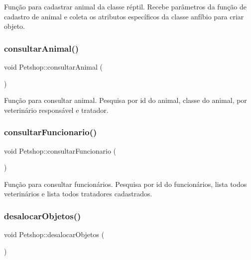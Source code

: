 Função para cadastrar animal da classe réptil. Recebe parâmetros da função de cadastro de animal e coleta os atributos específicos da classe anfíbio para criar objeto. \mbox{\label{classPetshop_af6e4fc598318c6ef7d9789a9328e312a}} 
\subsubsection{\texorpdfstring{consultar\+Animal()}{consultarAnimal()}}
{\footnotesize\ttfamily void Petshop\+::consultar\+Animal (\begin{DoxyParamCaption}{ }\end{DoxyParamCaption})}

Função para consultar animal. Pesquisa por id do animal, classe do animal, por veterinário responsável e tratador. \mbox{\label{classPetshop_ab4324d868f6aceeaa9ee34a9ae3b8349}} 
\subsubsection{\texorpdfstring{consultar\+Funcionario()}{consultarFuncionario()}}
{\footnotesize\ttfamily void Petshop\+::consultar\+Funcionario (\begin{DoxyParamCaption}{ }\end{DoxyParamCaption})}

Função para consultar funcionários. Pesquisa por id do funcionários, lista todos veterinários e lista todos tratadores cadastrados. \mbox{\label{classPetshop_af6269c2a28c849dc2ebf21e7438fec53}} 
\subsubsection{\texorpdfstring{desalocar\+Objetos()}{desalocarObjetos()}}
{\footnotesize\ttfamily void Petshop\+::desalocar\+Objetos (\begin{DoxyParamCaption}{ }\end{DoxyParamCaption})}

